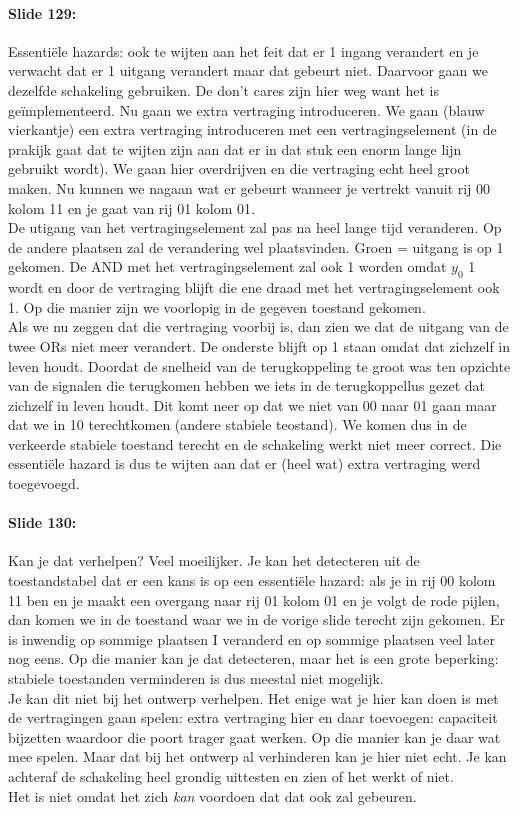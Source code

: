 \documentclass[10pt,a4paper]{book}
\begin{document}
\paragraph{Slide 129:} Essenti\"ele hazards: ook te wijten aan het feit dat er 1 ingang verandert en je verwacht dat er 1 uitgang verandert maar dat gebeurt niet. Daarvoor gaan we dezelfde schakeling gebruiken. De don't cares zijn hier weg want het is ge\"implementeerd. Nu gaan we extra vertraging introduceren. We gaan (blauw vierkantje) een extra vertraging introduceren met een vertragingselement (in de prakijk gaat dat te wijten zijn aan dat er in dat stuk een enorm lange lijn gebruikt wordt). We gaan hier overdrijven en die vertraging echt heel groot maken. Nu kunnen we nagaan wat er gebeurt wanneer je vertrekt vanuit rij 00 kolom 11 en je gaat van rij 01 kolom 01.\\
De utigang van het vertragingselement zal pas na heel lange tijd veranderen. Op de andere plaatsen zal de verandering wel plaatsvinden. Groen = uitgang is op 1 gekomen. De AND met het vertragingselement zal ook 1 worden omdat $y_0$ 1 wordt en door de vertraging blijft die ene draad met het vertragingselement ook 1. Op die manier zijn we voorlopig in de gegeven toestand gekomen.\\
Als we nu zeggen dat die vertraging voorbij is, dan zien we dat de uitgang van de twee ORs niet meer verandert. De onderste blijft op 1 staan omdat dat zichzelf in leven houdt. Doordat de snelheid van de terugkoppeling te groot was ten opzichte van de signalen die terugkomen hebben we iets in de terugkoppellus gezet dat zichzelf in leven houdt. Dit komt neer op dat we niet van 00 naar 01 gaan maar dat we in 10 terechtkomen (andere stabiele teostand). We komen dus in de verkeerde stabiele toestand terecht en de schakeling werkt niet meer correct. Die essenti\"ele hazard is dus te wijten aan dat er (heel wat) extra vertraging werd toegevoegd. 

\paragraph{Slide 130:} Kan je dat verhelpen? Veel moeilijker. Je kan het detecteren uit de toestandstabel dat er een kans is op een essenti\"ele hazard: als je in rij 00 kolom 11 ben en je maakt een overgang naar rij 01 kolom 01 en je volgt de rode pijlen, dan komen we in de toestand waar we in de vorige slide terecht zijn gekomen. Er is inwendig op sommige plaatsen I %
 veranderd en op sommige plaatsen veel later nog eens. Op die manier kan je dat detecteren, maar het is een grote beperking: stabiele toestanden verminderen is dus meestal niet mogelijk.\\
Je kan dit niet bij het ontwerp verhelpen. Het enige wat je hier kan doen is met de vertragingen gaan spelen: extra vertraging hier en daar toevoegen: capaciteit bijzetten waardoor die poort trager gaat werken. Op die manier kan je daar wat mee spelen. Maar dat bij het ontwerp al verhinderen kan je hier niet echt. Je kan achteraf de schakeling heel grondig uittesten en zien of het werkt of niet.\\
Het is niet omdat het zich \emph{kan} voordoen dat dat ook zal gebeuren. 
\end{document}
